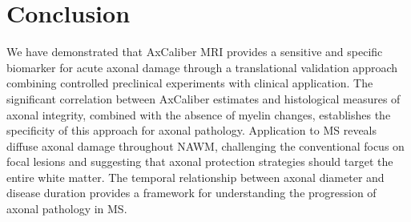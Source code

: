 \documentclass[11pt]{article}
\begin{document}
\section{Conclusion}

We have demonstrated that AxCaliber MRI provides a sensitive and specific biomarker for acute axonal damage through a translational validation approach combining controlled preclinical experiments with clinical application. The significant correlation between AxCaliber estimates and histological measures of axonal integrity, combined with the absence of myelin changes, establishes the specificity of this approach for axonal pathology. Application to MS reveals diffuse axonal damage throughout NAWM, challenging the conventional focus on focal lesions and suggesting that axonal protection strategies should target the entire white matter. The temporal relationship between axonal diameter and disease duration provides a framework for understanding the progression of axonal pathology in MS.



\end{document}

